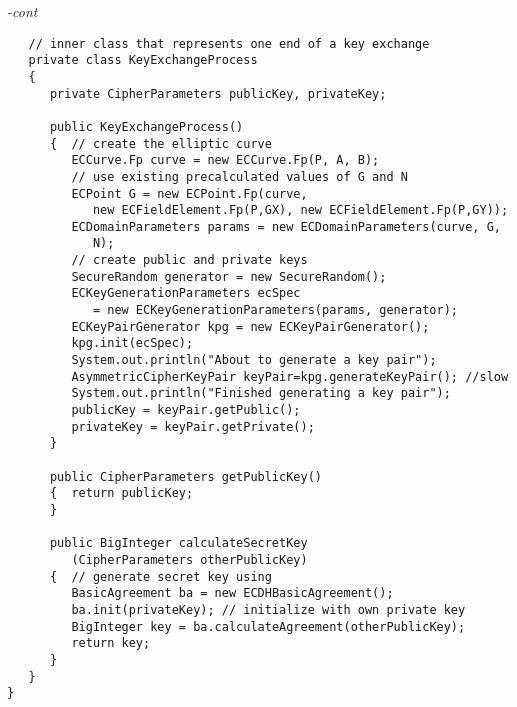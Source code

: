 \begin{figure*}\begin{program}\emph{-cont}\begin{verbatim}
   // inner class that represents one end of a key exchange
   private class KeyExchangeProcess
   {
      private CipherParameters publicKey, privateKey;

      public KeyExchangeProcess()
      {  // create the elliptic curve
         ECCurve.Fp curve = new ECCurve.Fp(P, A, B);
         // use existing precalculated values of G and N
         ECPoint G = new ECPoint.Fp(curve,
            new ECFieldElement.Fp(P,GX), new ECFieldElement.Fp(P,GY));
         ECDomainParameters params = new ECDomainParameters(curve, G,
            N);
         // create public and private keys
         SecureRandom generator = new SecureRandom();
         ECKeyGenerationParameters ecSpec
            = new ECKeyGenerationParameters(params, generator);
         ECKeyPairGenerator kpg = new ECKeyPairGenerator();
         kpg.init(ecSpec);
         System.out.println("About to generate a key pair");
         AsymmetricCipherKeyPair keyPair=kpg.generateKeyPair(); //slow
         System.out.println("Finished generating a key pair");
         publicKey = keyPair.getPublic();
         privateKey = keyPair.getPrivate();
      }

      public CipherParameters getPublicKey()
      {  return publicKey;
      }

      public BigInteger calculateSecretKey
         (CipherParameters otherPublicKey)
      {  // generate secret key using
         BasicAgreement ba = new ECDHBasicAgreement();
         ba.init(privateKey); // initialize with own private key
         BigInteger key = ba.calculateAgreement(otherPublicKey);
         return key;
      }
   }
}
\end{verbatim}\end{program}\end{figure*}


